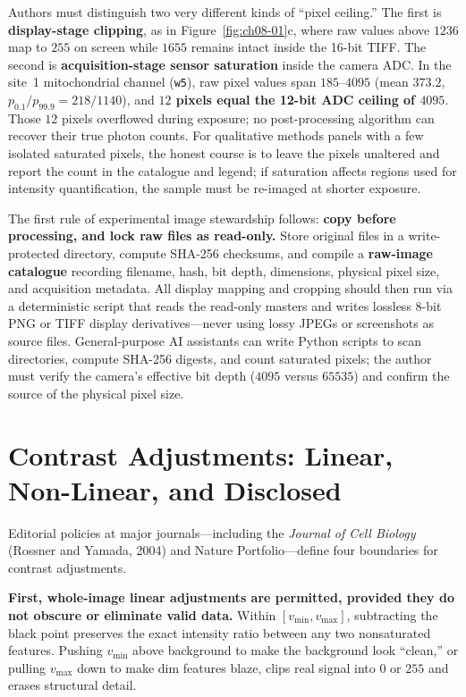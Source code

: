 Authors must distinguish two very different kinds of ``pixel ceiling.'' The first is \textbf{display-stage clipping}, as in Figure~\ref{fig:ch08-01}c, where raw values above $1236$ map to $255$ on screen while $1655$ remains intact inside the 16-bit TIFF. The second is \textbf{acquisition-stage sensor saturation} inside the camera ADC. In the site~1 mitochondrial channel (\texttt{w5}), raw pixel values span $185\text{--}4095$ (mean $373.2$, $p_{0.1}/p_{99.9} = 218/1140$), and \textbf{$12$ pixels equal the 12-bit ADC ceiling of $4095$}. Those $12$ pixels overflowed during exposure; no post-processing algorithm can recover their true photon counts. For qualitative methods panels with a few isolated saturated pixels, the honest course is to leave the pixels unaltered and report the count in the catalogue and legend; if saturation affects regions used for intensity quantification, the sample must be re-imaged at shorter exposure.

The first rule of experimental image stewardship follows: \textbf{copy before processing, and lock raw files as read-only.} Store original files in a write-protected directory, compute SHA-256 checksums, and compile a \textbf{raw-image catalogue} recording filename, hash, bit depth, dimensions, physical pixel size, and acquisition metadata. All display mapping and cropping should then run via a deterministic script that reads the read-only masters and writes lossless 8-bit PNG or TIFF display derivatives---never using lossy JPEGs or screenshots as source files. General-purpose AI assistants can write Python scripts to scan directories, compute SHA-256 digests, and count saturated pixels; the author must verify the camera's effective bit depth ($4095$ versus $65535$) and confirm the source of the physical pixel size.

\section{Contrast Adjustments: Linear, Non-Linear, and Disclosed}

Editorial policies at major journals---including the \emph{Journal of Cell Biology} (Rossner and Yamada, 2004) and Nature Portfolio---define four boundaries for contrast adjustments.

\textbf{First, whole-image linear adjustments are permitted, provided they do not obscure or eliminate valid data.} Within $[v_{\min}, v_{\max}]$, subtracting the black point preserves the exact intensity ratio between any two nonsaturated features. Pushing $v_{\min}$ above background to make the background look ``clean,'' or pulling $v_{\max}$ down to make dim features blaze, clips real signal into $0$ or $255$ and erases structural detail.

